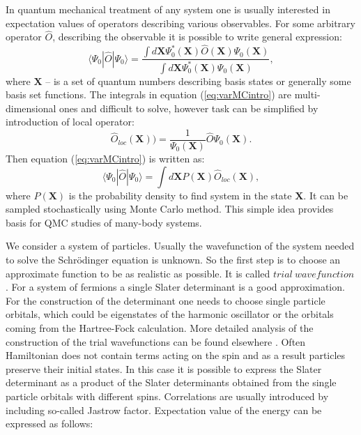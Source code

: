 \documentclass[twoside,english]{uiofysmaster}
\begin{document}
In quantum mechanical treatment of any system one is usually interested in expectation values of operators describing various observables.
For some arbitrary operator $\hat{O}$, describing the observable it is possible to write general expression:
\begin{equation}\label{eq:varMCintro}
\langle \Psi_0 |\hat{O}| \Psi_0 \rangle = \frac{\int d\boldsymbol{X}\Psi_0^{\ast}(\boldsymbol{X})\hat{O}(\boldsymbol{X})\Psi_0(\boldsymbol{X})}
{\int d\boldsymbol{X}\Psi_0^{\ast}(\boldsymbol{X})\Psi_0(\boldsymbol{X})},
\end{equation}
where $\boldsymbol{X}$ -- is a set of quantum numbers describing basis states or generally some basis set functions. The integrals in equation (\ref{eq:varMCintro}) are multi-dimensional ones and difficult to solve, however task can be simplified by introduction of local operator:
\begin{equation}\label{eq:varMCintro1}
\hat{O}_{loc}(\boldsymbol{X})) = \frac{1}{\Psi_0(\boldsymbol{X})} \hat{O} \Psi_0(\boldsymbol{X}).
\end{equation}
Then equation (\ref{eq:varMCintro}) is written as:
\begin{equation}\label{eq:varMCintro3}
\langle \Psi_0 |\hat{O}| \Psi_0 \rangle = \int d\boldsymbol{X} P(\boldsymbol{X})\hat{O}_{loc}(\boldsymbol{X}),
\end{equation}
where $P(\boldsymbol{X})$ is the probability density to find system in the state $\boldsymbol{X}$. It can be sampled stochastically using Monte Carlo method.
This simple idea provides basis for QMC studies of many-body systems. 

We consider a system of particles. Usually the wavefunction of the system needed to solve the Schr\"{o}dinger equation is unknown. So the first step is to choose an approximate function to be as realistic as possible. It is called $trial\ wavefunction$. For a system of fermions a single Slater determinant is a good approximation.
For the construction of the determinant one needs to choose single particle orbitals, which could be eigenstates of the harmonic oscillator or the orbitals coming from the Hartree-Fock calculation. More detailed analysis of the construction of the trial wavefunctions can be found elsewhere \cite{Hjorth-Jensenadvancedcoursecomputational2017} \cite{S.KvaalLectureNotesFysKjm44802015}.
Often Hamiltonian does not contain terms acting on the spin and as a result particles preserve their initial states. In this case it is possible to express the Slater determinant as a product of the Slater determinants obtained from the single particle orbitals with different spins. Correlations are usually introduced by including so-called Jastrow factor.
Expectation value of the energy can be expressed as follows:
\end{document}
